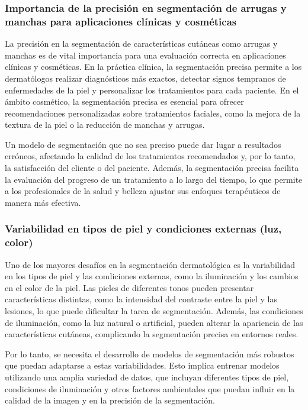 \subsubsection{Importancia de la precisión en segmentación de arrugas y manchas para aplicaciones clínicas y cosméticas}
La precisión en la segmentación de características cutáneas como arrugas y manchas es de vital importancia para una evaluación correcta en aplicaciones clínicas y cosméticas. En la práctica clínica, la segmentación precisa permite a los dermatólogos realizar diagnósticos más exactos, detectar signos tempranos de enfermedades de la piel y personalizar los tratamientos para cada paciente. En el ámbito cosmético, la segmentación precisa es esencial para ofrecer recomendaciones personalizadas sobre tratamientos faciales, como la mejora de la textura de la piel o la reducción de manchas y arrugas.

Un modelo de segmentación que no sea preciso puede dar lugar a resultados erróneos, afectando la calidad de los tratamientos recomendados y, por lo tanto, la satisfacción del cliente o del paciente. Además, la segmentación precisa facilita la evaluación del progreso de un tratamiento a lo largo del tiempo, lo que permite a los profesionales de la salud y belleza ajustar sus enfoques terapéuticos de manera más efectiva. \parencite{chuchu2020}

\subsubsection{Variabilidad en tipos de piel y condiciones externas (luz, color)}
Uno de los mayores desafíos en la segmentación dermatológica es la variabilidad en los tipos de piel y las condiciones externas, como la iluminación y los cambios en el color de la piel. Las pieles de diferentes tonos pueden presentar características distintas, como la intensidad del contraste entre la piel y las lesiones, lo que puede dificultar la tarea de segmentación. Además, las condiciones de iluminación, como la luz natural o artificial, pueden alterar la apariencia de las características cutáneas, complicando la segmentación precisa en entornos reales.

Por lo tanto, se necesita el desarrollo de modelos de segmentación más robustos que puedan adaptarse a estas variabilidades. Esto implica entrenar modelos utilizando una amplia variedad de datos, que incluyan diferentes tipos de piel, condiciones de iluminación y otros factores ambientales que puedan influir en la calidad de la imagen y en la precisión de la segmentación. \parencite{zhao2021}

